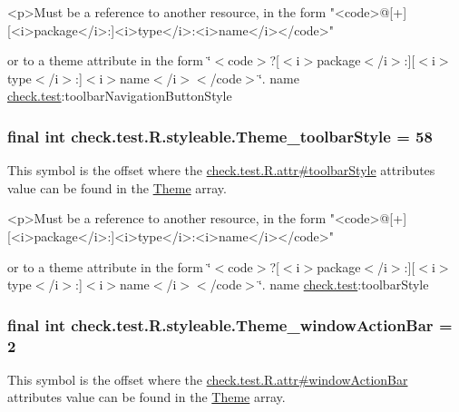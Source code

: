 \begin{DoxyVerb}      <p>Must be a reference to another resource, in the form "<code>@[+][<i>package</i>:]<i>type</i>:<i>name</i></code>"
\end{DoxyVerb}
 or to a theme attribute in the form \char`\"{}$<$code$>$?\mbox{[}$<$i$>$package$<$/i$>$\+:\mbox{]}\mbox{[}$<$i$>$type$<$/i$>$\+:\mbox{]}$<$i$>$name$<$/i$>$$<$/code$>$\char`\"{}.  name \hyperlink{namespacecheck_1_1test}{check.\+test}\+:toolbar\+Navigation\+Button\+Style \hypertarget{classcheck_1_1test_1_1_r_1_1styleable_a3e0a6d9c5645dc0e8bc6e32efbf36b28}{}
\subsubsection[{Theme\+\_\+toolbar\+Style}]{\setlength{\rightskip}{0pt plus 5cm}final int check.\+test.\+R.\+styleable.\+Theme\+\_\+toolbar\+Style = 58\hspace{0.3cm}{\ttfamily [static]}}\label{classcheck_1_1test_1_1_r_1_1styleable_a3e0a6d9c5645dc0e8bc6e32efbf36b28}
This symbol is the offset where the \hyperlink{classcheck_1_1test_1_1_r_1_1attr_acbe9493c0eb16a5b6b5149aab310f271}{check.\+test.\+R.\+attr\#toolbar\+Style} attribute\textquotesingle{}s value can be found in the \hyperlink{classcheck_1_1test_1_1_r_1_1styleable_acca726d02016a0cf607782ec3a436a81}{Theme} array.

\begin{DoxyVerb}      <p>Must be a reference to another resource, in the form "<code>@[+][<i>package</i>:]<i>type</i>:<i>name</i></code>"
\end{DoxyVerb}
 or to a theme attribute in the form \char`\"{}$<$code$>$?\mbox{[}$<$i$>$package$<$/i$>$\+:\mbox{]}\mbox{[}$<$i$>$type$<$/i$>$\+:\mbox{]}$<$i$>$name$<$/i$>$$<$/code$>$\char`\"{}.  name \hyperlink{namespacecheck_1_1test}{check.\+test}\+:toolbar\+Style \hypertarget{classcheck_1_1test_1_1_r_1_1styleable_adc8b4e64798d8c55e475a6440a5c6aac}{}
\subsubsection[{Theme\+\_\+window\+Action\+Bar}]{\setlength{\rightskip}{0pt plus 5cm}final int check.\+test.\+R.\+styleable.\+Theme\+\_\+window\+Action\+Bar = 2\hspace{0.3cm}{\ttfamily [static]}}\label{classcheck_1_1test_1_1_r_1_1styleable_adc8b4e64798d8c55e475a6440a5c6aac}
This symbol is the offset where the \hyperlink{classcheck_1_1test_1_1_r_1_1attr_a8acf10ee7b5c99830207704fc5046ebd}{check.\+test.\+R.\+attr\#window\+Action\+Bar} attribute\textquotesingle{}s value can be found in the \hyperlink{classcheck_1_1test_1_1_r_1_1styleable_acca726d02016a0cf607782ec3a436a81}{Theme} array.

